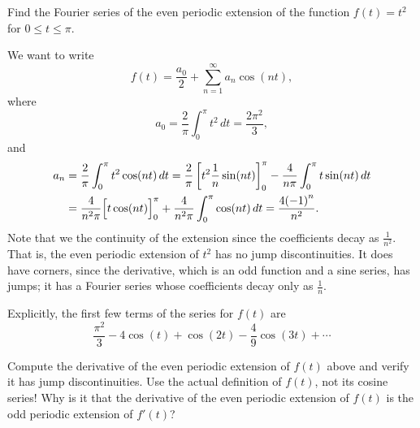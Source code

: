
\begin{example}
Find the Fourier series of the even periodic extension of 
the function $f(t) = t^2$ for $0 \leq t \leq \pi$.

We want to write
\begin{equation*}
f(t) = \frac{a_0}{2} + \sum_{n=1}^\infty a_n \cos (n t) ,
\end{equation*}
where
\begin{equation*}
a_0 = \frac{2}{\pi}
\int_0^\pi t^2 \, dt = \frac{2 \pi^2}{3} ,
\end{equation*}
and
\begin{equation*}
\begin{split}
a_n & = \frac{2}{\pi}
\int_0^\pi t^2 \cos (n t) \, dt
= \frac{2}{\pi} \left[ t^2 \frac{1}{n} \sin (nt) \right]_0^\pi -
\frac{4}{n\pi}
\int_0^\pi t \sin (n t) \, dt \\
& = 
\frac{4}{n^2\pi}
\Bigl[ t \cos (n t) \Bigr]_0^\pi
+
\frac{4}{n^2\pi}
\int_0^\pi \cos (n t) \, dt
= 
\frac{4{(-1)}^n}{n^2} .
\end{split}
\end{equation*}
Note that we  the continuity of the extension since the
coefficients decay as $\frac{1}{n^2}$.  That is, the even periodic extension
of $t^2$ has no jump discontinuities.  It does have corners, since
the derivative, which is an odd function and a sine series, has jumps; it has
a Fourier series whose coefficients decay only as $\frac{1}{n}$.

Explicitly, the first few terms of the series for $f(t)$ are
\begin{equation*}
\frac{\pi^2}{3} - 4 \cos (t) + \cos (2t) - \frac{4}{9} \cos (3t) + \cdots
\end{equation*}
\end{example}

\begin{exercise}
\leavevmode
\begin{tasks}
\task Compute the derivative of the even periodic extension of $f(t)$ above and verify it
has jump discontinuities.  Use the actual definition of $f(t)$, not its cosine
series!
\task Why is it that the derivative of the even periodic extension of $f(t)$ is the
odd periodic extension of $f'(t)$?
\end{tasks}
\end{exercise}

